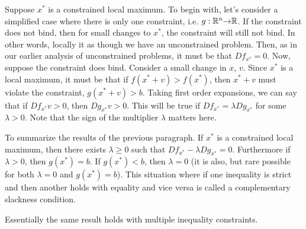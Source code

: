 Suppose $x^*$ is a constrained local maximum. To begin with, let's
consider a simplified case where there is only one constraint,
i.e. $g:\mathbb{R}^n {\rightarrow} \mathbb{R}$. If the constraint does not bind, then for small
changes to $x^*$, the constraint will still not bind. In other words,
locally it as though we have an unconstrained problem. Then, as in our
earlier analysis of unconstrained problems, it must be that $Df_{x^*}
= 0$. Now, suppose the constraint does bind. Consider a small change
in $x$, $v$. Since $x^*$ is a local maximum, it must be that if $f(x^*
+ v) > f(x^*)$, then $x^* + v$ must violate the constraint, $g(x^* +
v) > b$.  Taking first order expansions, we can say that if $Df_{x^*}
v > 0$, then $Dg_{x^*} v > 0$. This will be true if $Df_{x^*} =
\lambda Dg_{x^*}$ for some $\lambda > 0$. Note that the sign of the
multiplier $\lambda$ matters here. 

To summarize the results of the previous paragraph. If $x^*$ is a
constrained local maximum, then there exists $\lambda \geq 0$ such
that $Df_{x^*} - \lambda Dg_{x^*} = 0$. Furthermore if $\lambda > 0$, then
$g(x^*) = b$. If $g(x^*) < b$, then $\lambda = 0$ (it is also, but
rare possible for both $\lambda = 0$ and $g(x^*) = b$). This situation
where if one inequality is strict and then another holds with equality
and vice versa is called a complementary slackness condition. 

Essentially the same result holds with multiple inequality
constraints. 
 
